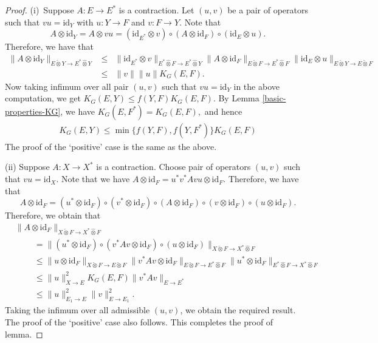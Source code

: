 \documentclass[a4paper,oneside,11pt, reqno]{amsart}
\numberwithin{equation}{section}
\theoremstyle{plain}
\begin{document}
\begin{proof}
 (i)~Suppose $A:E\to E^*$ is a contraction. Let $(u,v)$ be a pair of operators such that $vu=\text{id}_{Y}$ with $u:Y\to F$ and $v:F\to Y.$ Note that \[A\otimes \text{id}_{Y}=A\otimes vu=(\text{id}_{E^*}\otimes v)\circ(A\otimes\text{id}_F)\circ (\text{id}_E\otimes u).\] Therefore, we have that
 \begin{eqnarray*}\|A\otimes\text{id}_{Y}\|_{E\check{\otimes}Y\to E^*\hat{\otimes}Y}
&\leqslant &\|\text{id}_{E^*}\otimes v\|_{E^*\hat{\otimes}F\to E^*\hat{\otimes}Y}
\|A\otimes\text{id}_F\|_{E\check{\otimes}F\to E^*\hat{\otimes}F}\|\text{id}_{E}\otimes u\|_{E\check{\otimes}Y\to E\check{\otimes}F}\\
&\leqslant& \|v\|\|u\|K_G(E,F).
\end{eqnarray*}
 Now taking infimum over all pair $(u,v)$ such that $vu=\text{id}_Y$ in the above computation, we get  $K_G(E,Y)\leqslant f(Y,F)K_G(E,F).$ By Lemma \ref{basic-properties-KG}, we have $K_G(E,F^*)=K_G(E,F),$ and hence
 \begin{eqnarray*}
 K_G(E,Y)\leqslant \min\{f(Y,F),f(Y,F^*)\} K_G(E,F)
 \end{eqnarray*}
 The proof of the `positive' case is the same as the above.



(ii) Suppose $A:X\to X^*$ is a contraction. 
Choose pair of operators $(u,v)$ such that $vu=\text{id}_{X}.$ Note that we have $A\otimes\text{id}_F=u^*v^*Avu\otimes\text{id}_F.$ Therefore, we have that
\[A\otimes \text{id}_F=(u^*\otimes\text{id}_F)\circ (v^*\otimes\text{id}_F)\circ (A\otimes\text{id}_F)\circ (v\otimes\text{id}_F)\circ (u\otimes\text{id}_F).\] 
Therefore, we obtain that 
\begin{equation*}
\begin{split}
&\|A\otimes\text{id}_F\|_{X\check{\otimes}F\to X^*\hat{\otimes}F}\\
&\phantom{Ohm}=\|(u^*\otimes\text{id}_F)\circ (v^*Av\otimes\text{id}_F)\circ (u\otimes\text{id}_F)\|_{X\check{\otimes}F\to X^*\hat{\otimes}F}\\
&\phantom{Ohm}\leqslant\|u\otimes \text{id}_F\|_{X\check{\otimes}F\to E\check{\otimes}F}\|v^*Av\otimes \text{id}_F\|_{E\check{\otimes}F\to E^*\hat{\otimes}F}\|u^*\otimes\text{id}_F\|_{E^*\hat{\otimes}F\to X^*\hat{\otimes}F}\\
&\phantom{Ohm}\leqslant\|u\|_{X\to E}^2K_G(E,F)\|v^*Av\|_{E\to E^*}\\
&\phantom{Ohm}\leqslant\|u\|_{E_1\to E}^2\|v\|_{E\to E_1}^2.
\end{split}
\end{equation*}
Taking the infimum over all admissible $(u,v)$, we obtain the required result.
 The proof of the `positive' case also follows.
This completes the proof of lemma.
\end{proof}
\end{document}
